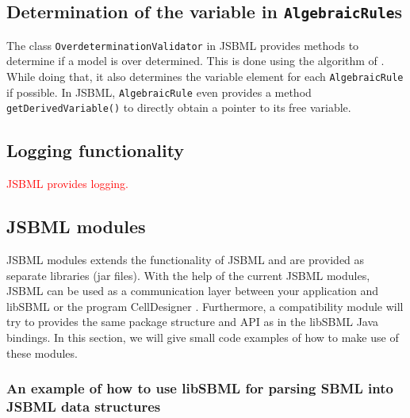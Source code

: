 \documentclass[
  BCOR12mm,
  letterpaper,
  11pt,
  headsepline,
  pointlessnumbers,
  tablecaptionabove,
  onelinecaption,
  headinclude,
  appendixprefix,
  idxtotoc,
  bibtotoc,
  twoside,
  titlepage
]{scrartcl}
\begin{document}
\subsection{Determination of the variable in \texttt{AlgebraicRule}s}

The class \texttt{OverdeterminationValidator}
in JSBML provides methods to
determine if a model
is over determined. This is done using the algorithm of \citet{Hopcroft1973}.
While doing that, it also determines the variable element for each
\texttt{AlgebraicRule} if
possible. In JSBML, \texttt{AlgebraicRule} even provides a method
\texttt{getDerivedVariable()} to directly obtain a pointer to its free variable.


\subsection{Logging functionality}

\textcolor{red}{JSBML provides logging.}

\subsection{JSBML modules}

JSBML modules extends the functionality of JSBML and are provided as separate
libraries (jar files). With the help of the current JSBML modules, JSBML can be
used as a communication layer  between your
application and libSBML \citep{Bornstein2008} or the program CellDesigner
\citep{Funahashi2003}. Furthermore, a compatibility module
will try to provides the same package structure and API as in the libSBML Java
bindings. In this section, we will give small code examples of how to make use
of these modules.

\subsubsection{An example of how to use libSBML for parsing SBML into JSBML data
structures}
\end{document}
